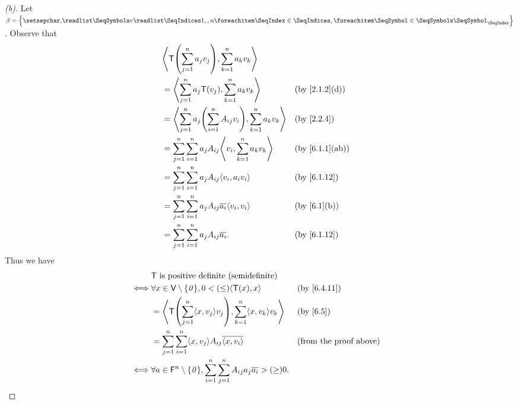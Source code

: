 \begin{proof}[(b)]
	Let \(\beta = \set{\seq{v}{1,,n}}\).
	Observe that
	\begin{align*}
		 & \inn{\T\pa{\sum_{j = 1}^n a_j v_j}, \sum_{k = 1}^n a_k v_k}                                            \\
		 & = \inn{\sum_{j = 1}^n a_j \T(v_j), \sum_{k = 1}^n a_k v_k}                         &  & \by{2.1.2}[d]  \\
		 & = \inn{\sum_{j = 1}^n a_j \pa{\sum_{i = 1}^n A_{i j} v_i}, \sum_{k = 1}^n a_k v_k} &  & \by{2.2.4}     \\
		 & = \sum_{j = 1}^n \sum_{i = 1}^n a_j A_{i j} \inn{v_i, \sum_{k = 1}^n a_k v_k}      &  & \by{6.1.1}[ab] \\
		 & = \sum_{j = 1}^n \sum_{i = 1}^n a_j A_{i j} \inn{v_i, a_i v_i}                     &  & \by{6.1.12}    \\
		 & = \sum_{j = 1}^n \sum_{i = 1}^n a_j A_{i j} \conj{a_i} \inn{v_i, v_i}              &  & \by{6.1}[b]    \\
		 & = \sum_{j = 1}^n \sum_{i = 1}^n a_j A_{i j} \conj{a_i}.                            &  & \by{6.1.12}
	\end{align*}
	Thus we have
	\begin{align*}
		     & \T \text{ is positive definite (semidefinite)}                                                                                                  \\
		\iff & \forall x \in \V \setminus \set{\zv}, 0 < (\leq) \inn{\T(x), x}                                              &  & \by{6.4.11}                   \\
		     & = \inn{\T\pa{\sum_{j = 1}^n \inn{x, v_j} v_j}, \sum_{k = 1}^n \inn{x, v_k} v_k}                              &  & \by{6.5}                      \\
		     & = \sum_{j = 1}^n \sum_{i = 1}^n \inn{x, v_j} A_{i j} \conj{\inn{x, v_i}}                                     &  & \text{(from the proof above)} \\
		\iff & \forall a \in \vs{F}^n \setminus \set{\zv}, \sum_{i = 1}^n \sum_{j = 1}^n A_{i j} a_j \conj{a_i} > (\geq) 0.
	\end{align*}
\end{proof}

